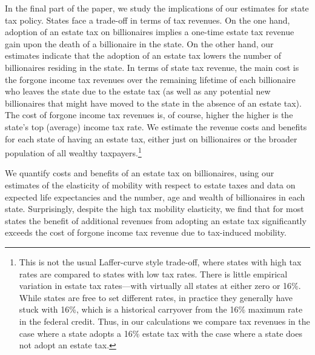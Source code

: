 \documentclass[12pt]{article}
\begin{document}
In the final part of the paper, we study the implications of our estimates for state tax policy. 
States face a trade-off in terms of tax revenues. On the one hand, adoption of an estate tax on billionaires implies a one-time estate tax revenue gain upon the death of a billionaire in the state. On the other hand, our estimates indicate that the adoption of an estate tax lowers the number of billionaires residing in the state. In terms of state tax revenue, the main cost is the forgone income tax revenues over the remaining lifetime of each billionaire who leaves the state due to the estate tax (as well as any potential new billionaires that might have moved to the state in the absence of an estate tax). The cost of forgone income tax revenues is, of course, higher the higher is the state's top (average) income tax rate. 
We estimate the revenue costs and benefits for each state of having an estate tax, either just on billionaires or the broader population of all wealthy taxpayers.\footnote{This is not the usual Laffer-curve style trade-off, where states with high tax rates are compared to states with low tax rates. There is little empirical variation in estate tax rates---with virtually all states at either zero or 16\%. While states are free to set different rates, in practice they generally have stuck with 16\%, which is a historical carryover from the 16\% maximum rate in the federal credit. Thus, in our calculations we compare tax revenues in the case where a state adopts a 16\% estate tax with  the case where a state does not adopt an estate tax.}  

We quantify costs and benefits of an estate tax on billionaires, using our estimates of the elasticity of mobility with respect to estate taxes and data on expected life expectancies and the number, age and wealth of billionaires in each state. Surprisingly, 
despite the high tax mobility elasticity, we find that for most states the benefit of additional revenues from adopting an estate tax significantly exceeds the cost of forgone income tax revenue due to tax-induced mobility.
\end{document}
